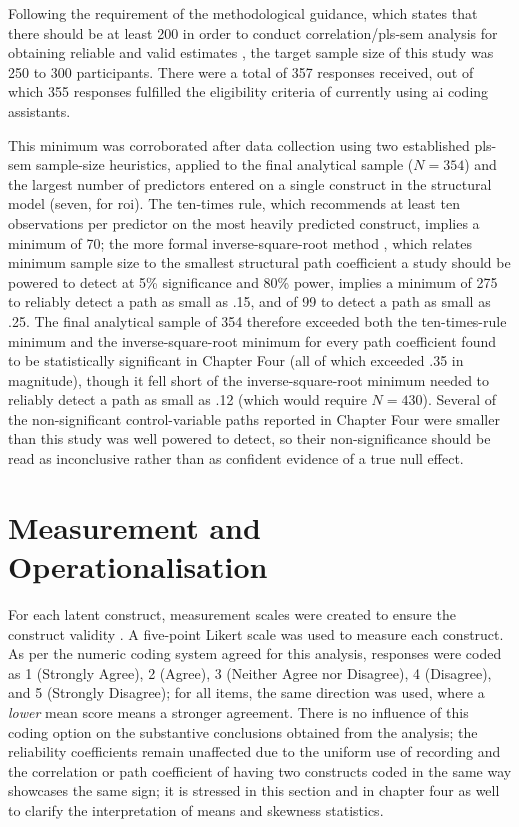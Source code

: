 Following the requirement of the methodological guidance, which states that there should be at least 200 in order to conduct correlation/\gls{pls-sem} analysis for obtaining reliable and valid estimates \autocite{Hair2019}, the target sample size of this study was 250 to 300 participants. There were a total of 357 responses received, out of which 355 responses fulfilled the eligibility criteria of currently using \gls{ai} coding assistants.

This minimum was corroborated after data collection using two established \gls{pls-sem} sample-size heuristics, applied to the final analytical sample ($N=354$) and the largest number of predictors entered on a single construct in the structural model (seven, for \gls{roi}). The ten-times rule, which recommends at least ten observations per predictor on the most heavily predicted construct, implies a minimum of 70; the more formal inverse-square-root method \autocite{Kock2018}, which relates minimum sample size to the smallest structural path coefficient a study should be powered to detect at 5\% significance and 80\% power, implies a minimum of 275 to reliably detect a path as small as .15, and of 99 to detect a path as small as .25. The final analytical sample of 354 therefore exceeded both the ten-times-rule minimum and the inverse-square-root minimum for every path coefficient found to be statistically significant in Chapter Four (all of which exceeded .35 in magnitude), though it fell short of the inverse-square-root minimum needed to reliably detect a path as small as .12 (which would require $N=430$). Several of the non-significant control-variable paths reported in Chapter Four were smaller than this study was well powered to detect, so their non-significance should be read as inconclusive rather than as confident evidence of a true null effect.

\section{Measurement and Operationalisation}
\label{sec:Measurement and Operationalisation}
For each latent construct, measurement scales were created to ensure the construct validity \autocite{DeVellis2022}. A five-point Likert scale was used to measure each construct. As per the numeric coding system agreed for this analysis, responses were coded as 1 (Strongly Agree), 2 (Agree), 3 (Neither Agree nor Disagree), 4 (Disagree), and 5 (Strongly Disagree); for all items, the same direction was used, where a \textit{lower} mean score means a stronger agreement. There is no influence of this coding option on the substantive conclusions obtained from the analysis; the reliability coefficients remain unaffected due to the uniform use of recording and the correlation or path coefficient of having two constructs coded in the same way showcases the same sign; it is stressed in this section and in chapter four as well to clarify the interpretation of means and skewness statistics.

